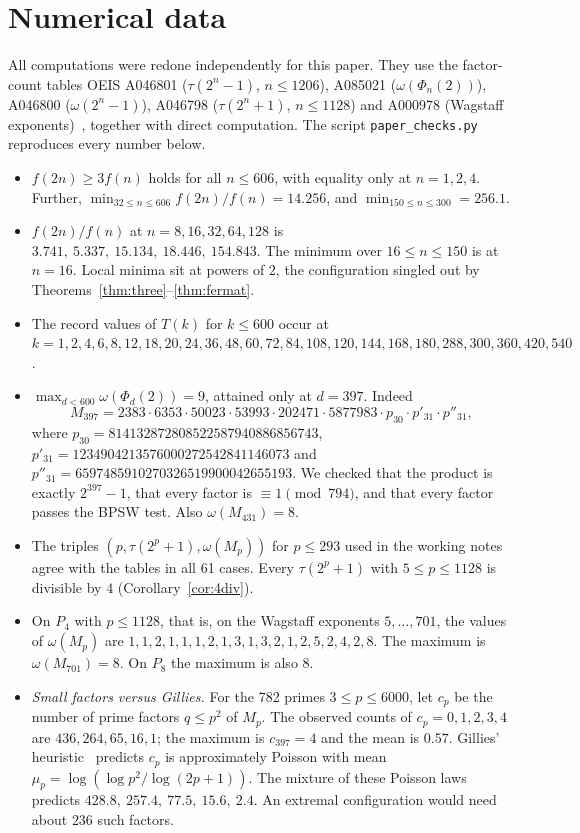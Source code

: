 \documentclass[11pt]{amsart}
\theoremstyle{definition}
\theoremstyle{remark}
\begin{document}
\section{Numerical data}\label{sec:data}
All computations were redone independently for this paper. They use the factor-count tables
OEIS A046801 ($\tau(2^n-1)$, $n\le1206$), A085021 ($\omega(\Phi_n(2))$), A046800 ($\omega(2^n-1)$), A046798
($\tau(2^n+1)$, $n\le1128$) and A000978 (Wagstaff exponents)~\cite{OEIS}, together with direct computation. The
script \texttt{paper\_checks.py} reproduces every number below.

\begin{itemize}
\item $f(2n)\ge3f(n)$ holds for all $n\le606$, with equality only at $n=1,2,4$. Further,
$\min_{32\le n\le606}f(2n)/f(n)=14.256$, and $\min_{150\le n\le300}=256.1$.
\item $f(2n)/f(n)$ at $n=8,16,32,64,128$ is $3.741,\ 5.337,\ 15.134,\ 18.446,\ 154.843$. The minimum over
$16\le n\le150$ is at $n=16$. Local minima sit at powers of $2$, the configuration singled out by
Theorems~\ref{thm:three}--\ref{thm:fermat}.
\item The record values of $T(k)$ for $k\le600$ occur at
$k=1,2,4,6,8,12,18,20,24,36,48,60,72,84,108,120,144,168,180,288,300,360,420,540$.
\item $\max_{d<600}\omega(\Phi_d(2))=9$, attained only at $d=397$. Indeed
\[
M_{397}=2383\cdot6353\cdot50023\cdot53993\cdot202471\cdot5877983\cdot p_{30}\cdot p'_{31}\cdot p''_{31},
\]
where $p_{30}=814132872808522587940886856743$, $p'_{31}=1234904213576000272542841146073$ and
$p''_{31}=6597485910270326519900042655193$. We checked that the product is exactly $2^{397}-1$, that every factor is
$\equiv1\pmod{794}$, and that every factor passes the BPSW test. Also $\omega(M_{431})=8$.
\item The triples $(p,\tau(2^p+1),\omega(M_p))$ for $p\le293$ used in the working notes agree with the tables in all
61 cases. Every $\tau(2^p+1)$ with $5\le p\le1128$ is divisible by $4$ (Corollary~\ref{cor:4div}).
\item On $P_4$ with $p\le1128$, that is, on the Wagstaff exponents $5,\dots,701$, the values of $\omega(M_p)$ are
$1,1,2,1,1,1,2,1,3,1,3,2,1,2,5,2,4,2,8$. The maximum is $\omega(M_{701})=8$. On $P_8$ the maximum is also $8$.
\item \emph{Small factors versus Gillies.} For the 782 primes $3\le p\le6000$, let $c_p$ be the number of prime factors
$q\le p^2$ of $M_p$. The observed counts of $c_p=0,1,2,3,4$ are $436,264,65,16,1$; the maximum is $c_{397}=4$ and the
mean is $0.57$. Gillies' heuristic~\cite{Gi64} predicts $c_p$ is approximately Poisson with mean
$\mu_p=\log(\log p^2/\log(2p+1))$. The mixture of these Poisson laws predicts $428.8,\ 257.4,\ 77.5,\ 15.6,\ 2.4$.
An extremal configuration would need about $236$ such factors.
\end{itemize}
\end{document}
